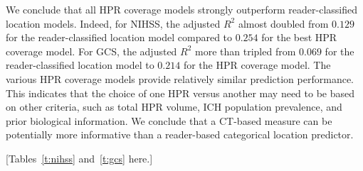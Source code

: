 \documentclass[10pt]{article}\usepackage[]{graphicx}\usepackage[]{color}
\begin{document}
%
%

We conclude that all HPR coverage models strongly outperform reader-classified location models. Indeed, for NIHSS, the adjusted $R^2$ almost doubled from $0.129$  for  the reader-classified location model compared to $0.254$ for the best HPR coverage model.  For GCS,
the adjusted $R^2$ more than tripled from $0.069$ for the reader-classified location model to $0.214$ for the HPR coverage model. The various HPR coverage models provide relatively similar prediction performance. This indicates that the choice of one HPR versus another may need to be based on other criteria, such as total HPR volume, ICH population prevalence, and prior biological information.
We conclude that a CT-based measure can be potentially more informative than a reader-based categorical location predictor. 



[Tables~\ref{t:nihss} and~\ref{t:gcs} here.]
\end{document}
